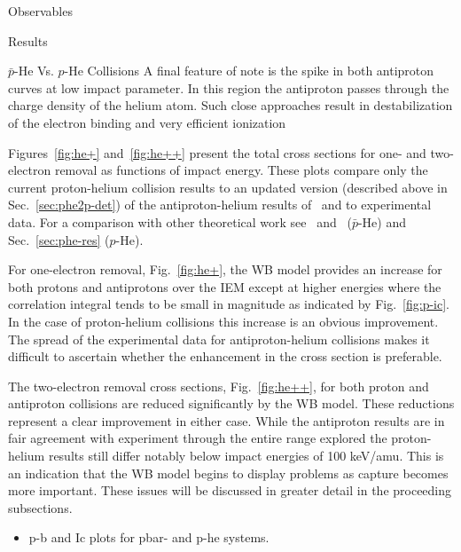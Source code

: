 \documentclass[letterpaper, 11 pt]{report}
\begin{document}
\begin{chapter}{Observables \label{chap:p-he2p-he}}
\begin{section}{Results \label{sec:phe2p-res}}
\begin{subsection}{ \texorpdfstring{$\bar{p}$}{pbar}-He Vs. \texorpdfstring{$p$}{p}-He Collisions
                         \label{sec:pbarhe-res}}
         A final feature of note is the spike in both antiproton curves at low impact parameter. In this
         region the antiproton passes through the charge density of the helium atom. Such close
         approaches result in destabilization of the electron binding and very efficient
         ionization~\cite{pbarhe-rev}

         Figures~\ref{fig:he+} and~\ref{fig:he++} present the total cross sections for one- and
         two-electron removal as functions of impact energy. These plots compare only the current
         proton-helium collision results to an updated version (described above in
         Sec.~\ref{sec:phe2p-det}) of the antiproton-helium results of~\cite{pbarhe} and to
         experimental data. For a comparison with other theoretical work see~\cite{pbarhe}
         and~\cite{new-pbarhe} ($\bar{p}$-He) and Sec.~\ref{sec:phe-res} ($p$-He).
   
         For one-electron removal, Fig.~\ref{fig:he+}, the WB model provides an increase for both protons
         and antiprotons over the IEM except at higher energies where the correlation integral tends to
         be small in magnitude as indicated by Fig.~\ref{fig:p-ic}. In the case of proton-helium
         collisions this increase is an obvious improvement. The spread of the experimental data for
         antiproton-helium collisions makes it difficult to ascertain whether the enhancement in the
         cross section is preferable.
   
         The two-electron removal cross sections, Fig.~\ref{fig:he++}, for both proton and antiproton
         collisions are reduced significantly by the WB model. These reductions represent a clear
         improvement in either case. While the antiproton results are in fair agreement with experiment
         through the entire range explored the proton-helium results still differ notably below impact
         energies of 100 keV/amu. This is an indication that the WB model begins to display problems as
         capture becomes more important. These issues will be discussed in greater detail in the
         proceeding subsections.

         \begin{itemize}

            \item p-b and Ic plots for pbar- and p-he systems.

         \end{itemize}

      \end{subsection}


\end{section}
\end{chapter}
\end{document}
